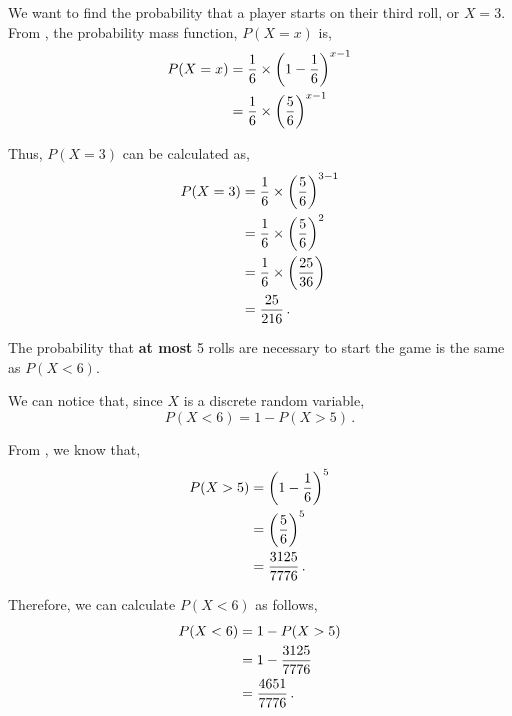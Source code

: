 \begin{subquestions}
\begin{subsubquestions}
	
\subquestion

We want to find the probability that a player starts on their third roll, or $X=3$. From , the probability mass function, $P(X=x)$ is,
\begin{align}
	P(X = x) & = \frac{1}{6} \times \left(1-\frac{1}{6} \right)^{x-1} \nonumber \\
	         & = \frac{1}{6} \times \left(\frac{5}{6} \right)^{x-1}
\end{align}
	
Thus, $P(X=3)$ can be calculated as,
\begin{align}
	P(X = 3) & = \frac{1}{6} \times \left(\frac{5}{6} \right)^{3-1} \nonumber \\
	         & = \frac{1}{6} \times \left(\frac{5}{6} \right)^{2} \nonumber \\
	         & = \frac{1}{6} \times \left(\frac{25}{36} \right) \nonumber \\
	         & = \frac{25}{216} \,.
\end{align}


\subsubquestion

The probability that \textbf{at most} 5 rolls are necessary to start the game is the same as $P(X<6)$. 

We can notice that, since $X$ is a discrete random variable,
\begin{equation}
	P(X<6) = 1 - P(X>5) \,.
\end{equation}

From , we know that,
\begin{align}
	P(X>5) & = \left(1 - \frac{1}{6} \right)^5 \nonumber \\
	       & = \left(\frac{5}{6} \right)^5 \nonumber \\
	       & = \frac{3125}{7776} \,.
\end{align}

Therefore, we can calculate $P(X<6)$ as follows,
\begin{align}
	P(X<6) & = 1 - P(X>5) \nonumber \\
	       & = 1 - \frac{3125}{7776} \nonumber \\
	       & = \frac{4651}{7776} \,.
\end{align}



\end{subsubquestions}
\end{subquestions}
